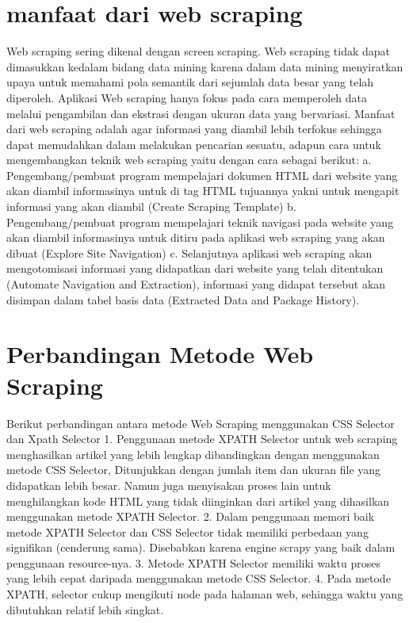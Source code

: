 \documentclass[12pt, a4paper]{article}
\begin{document}
\section{manfaat dari web scraping}
Web scraping sering dikenal dengan screen scraping. Web scraping tidak dapat dimasukkan kedalam bidang data
mining karena dalam data mining menyiratkan upaya untuk memahami pola semantik dari sejumlah data besar yang
telah diperoleh. Aplikasi Web scraping hanya fokus pada cara memperoleh data melalui pengambilan dan ekstrasi
dengan ukuran data yang bervariasi. Manfaat dari web scraping adalah agar informasi yang diambil lebih
terfokus sehingga dapat memudahkan dalam melakukan pencarian sesuatu, adapun cara untuk mengembangkan teknik
web scraping yaitu dengan cara sebagai berikut:
	a. Pengembang/pembuat program mempelajari dokumen HTML dari website yang akan diambil informasinya untuk
	   di tag HTML tujuannya yakni untuk mengapit informasi yang akan diambil (Create Scraping Template)
	b. Pengembang/pembuat program mempelajari teknik navigasi pada website yang akan diambil informasinya
	   untuk ditiru pada aplikasi web scraping yang akan dibuat (Explore Site Navigation)
	c. Selanjutnya aplikasi web scraping akan mengotomisasi informasi yang didapatkan dari website yang telah
	   ditentukan (Automate Navigation and Extraction), informasi yang didapat tersebut akan disimpan dalam 
	   tabel basis data (Extracted Data and Package History).

\section{Perbandingan Metode Web Scraping}
Berikut perbandingan antara metode Web Scraping menggunakan CSS Selector dan Xpath Selector
	1.	Penggunaan metode XPATH Selector untuk web scraping menghasilkan artikel yang lebih lengkap
	    dibandingkan dengan
		menggunakan metode CSS Selector, Ditunjukkan dengan jumlah item dan ukuran file yang didapatkan lebih
		besar.
		Namun juga menyisakan proses lain untuk menghilangkan kode HTML yang tidak diinginkan dari artikel
		yang dihasilkan menggunakan metode XPATH Selector.
	2.	Dalam penggunaan memori baik metode XPATH Selector dan CSS Selector tidak memiliki perbedaan yang
	    signifikan
		(cenderung sama). Disebabkan karena engine scrapy yang baik dalam penggunaan resource-nya. 
	3.	Metode XPATH Selector memiliki waktu proses yang lebih cepat daripada menggunakan metode CSS
	    Selector.
	4.	Pada metode XPATH, selector cukup mengikuti node pada halaman web, sehingga waktu yang dibutuhkan
		relatif lebih singkat.
\end{document}
